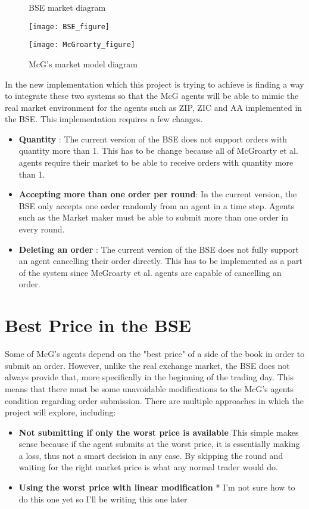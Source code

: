 \begin{figure}[h]
\caption{BSE market diagram} 
\texttt{[image: BSE\_figure]}
\caption{McG's market model diagram} 
\texttt{[image: McGroarty\_figure]}
\end{figure} 

In the new implementation which this project is trying to achieve is finding a way to integrate these two systems so that the McG agents will be able to mimic the real market environment for the agents such as ZIP, ZIC and AA implemented in the BSE. This implementation requires a few changes.

\begin{itemize}
    \item  \textbf{Quantity} : The current version of the BSE does not support orders with quantity more than 1. This has to be change because all of McGroarty et al. agents require their market to be able to receive orders with quantity more than 1. 
    \item  \textbf{Accepting more than one order per round}: In the current version, the BSE only accepts one order randomly from an agent in a time step. Agents such as the Market maker must be able to submit more than one order in every round. 
    \item \textbf{Deleting an order} : The current version of the BSE does not fully support an agent cancelling their order directly. This has to be implemented as a part of the system since McGroarty et al. agents are capable of cancelling an order.
\end{itemize} 

\section{Best Price in the BSE}
Some of McG's agents depend on the "best price" of a side of the book in order to submit an order. However, unlike the real exchange market, the BSE does not always provide that, more specifically in the beginning of the trading day. This means that there must be some unavoidable modifications to the McG's agents condition regarding order submission. There are multiple approaches in which the project will explore, including:

\begin{itemize}
    \item \textbf{Not submitting if only the worst price is available} This simple makes sense because if the agent submits at the worst price, it is essentially making a loss, thus not a smart decision in any case. By skipping the round and waiting for the right market price is what any normal trader would do. 
    
    \item \textbf{Using the worst price with linear modification} * I'm not sure how to do this one yet so I'll be writing this one later 
\end{itemize} 


%  